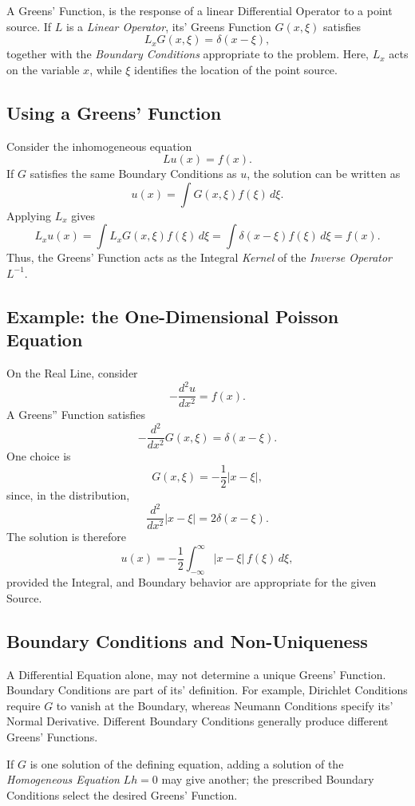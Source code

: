 \documentclass[a4paper, 10pt, onepage]{elegantbook}
\begin{document}
A Greens' Function, is the response of a linear Differential Operator to a point source. If \(L\) is a \emph{Linear Operator}, its' Greens Function
\(G(x,\xi)\) satisfies
\[
L_x G(x,\xi)=\delta(x-\xi),
\]
together with the \emph{Boundary Conditions} appropriate to the problem. Here, \(L_x\) acts on the variable \(x\), while \(\xi\) identifies the
location of the point source.

\subsection{Using a Greens' Function}

Consider the inhomogeneous equation
\[
L u(x)=f(x).
\]
If \(G\) satisfies the same Boundary Conditions as \(u\), the solution can be written as
\[
u(x)=\int G(x,\xi)f(\xi)\,d\xi.
\]
Applying \(L_x\) gives
\[
L_xu(x)
=\int L_xG(x,\xi)f(\xi)\,d\xi
=\int\delta(x-\xi)f(\xi)\,d\xi
=f(x).
\]
Thus, the Greens' Function acts as the Integral \emph{Kernel} of the \emph{Inverse
Operator} \(L^{-1}\).

\subsection{Example: the One-Dimensional Poisson Equation}

On the Real Line, consider
\[
-\frac{d^2u}{dx^2}=f(x).
\]
A Greens'' Function satisfies
\[
-\frac{d^2}{dx^2}G(x,\xi)=\delta(x-\xi).
\]
One choice is
\[
G(x,\xi)=-\frac{1}{2}|x-\xi|,
\]
since, in the distribution,
\[
\frac{d^2}{dx^2}|x-\xi|=2\delta(x-\xi).
\]
The solution is therefore
\[
u(x)=-\frac{1}{2}\int_{-\infty}^{\infty}
|x-\xi|\,f(\xi)\,d\xi,
\]
provided the Integral, and Boundary behavior are appropriate for the given Source.

\subsection{Boundary Conditions and Non-Uniqueness}

A Differential Equation alone, may not determine a unique Greens' Function. Boundary Conditions are part of its' definition. For example, Dirichlet Conditions require \(G\) to vanish at the Boundary, whereas Neumann Conditions specify its' Normal Derivative. Different Boundary Conditions generally produce different Greens' Functions.

If \(G\) is one solution of the defining equation, adding a solution of the \emph{Homogeneous Equation} \(Lh=0\) may give another; the prescribed
Boundary Conditions select the desired Greens' Function.
\end{document}
